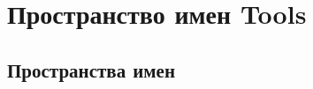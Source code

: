 \hypertarget{namespace_tools}{}\section{Пространство имен Tools}
\label{namespace_tools}
\subsection*{Пространства имен}
\begin{DoxyCompactItemize}
\end{DoxyCompactItemize}
